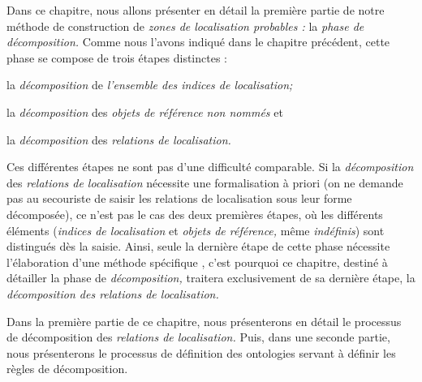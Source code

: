 Dans ce chapitre, nous allons présenter en détail la première partie
de notre méthode de construction de \emph{zones de localisation
  probables :} la \emph{phase de décomposition.} Comme nous l'avons
indiqué dans le chapitre précédent, cette phase se compose de trois
étapes distinctes :
%
\begin{enumerate*}[label=(\alph*)]
\item la \emph{décomposition} de \emph{l'ensemble des indices de
    localisation;}
\item la \emph{décomposition} des \emph{objets de référence non
    nommés} et
\item la \emph{décomposition} des \emph{relations de localisation.}
\end{enumerate*}
%
Ces différentes étapes ne sont pas d'une difficulté comparable. Si la
\emph{décomposition} des \emph{relations de localisation} nécessite
une formalisation à priori (on ne demande pas au secouriste de saisir
les relations de localisation sous leur forme décomposée), ce n'est
pas le cas des deux premières étapes, où les différents éléments
(\emph{indices de localisation} et \emph{objets de référence,} même
\emph{indéfinis}) sont distingués dès la saisie. Ainsi, seule la
dernière étape de cette phase nécessite l’élaboration d'une méthode
spécifique , c'est pourquoi ce chapitre, destiné à détailler la phase
de \emph{décomposition,} traitera exclusivement de sa dernière étape,
la \emph{décomposition des relations de localisation.}

Dans la première partie de ce chapitre, nous présenterons en détail le
processus de décomposition des \emph{relations de localisation.} Puis,
dans une seconde partie, nous présenterons le processus de définition
des ontologies servant à définir les règles de décomposition.

